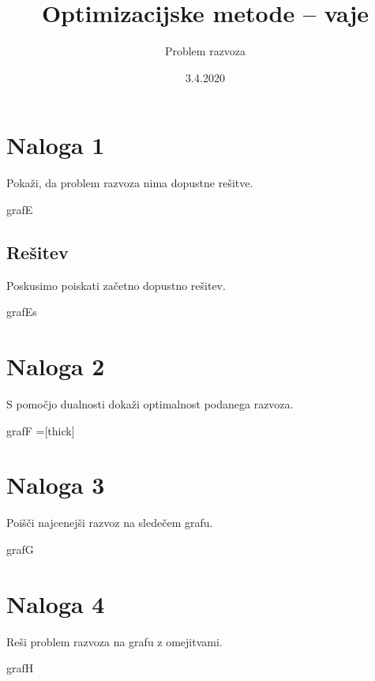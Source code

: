 \documentclass[14pt]{extarticle}
\title{Optimizacijske metode -- vaje}
\author{Problem razvoza}
\date{3.4.2020}
\begin{document}
\maketitle

\section*{Naloga 1}

Pokaži, da problem razvoza nima dopustne rešitve.

\begin{razvoz}{grafE}
\end{razvoz}

\clearpage

\subsection*{Rešitev}

Poskusimo poiskati začetno dopustno rešitev.

\begin{razvoz}{grafEs}
\end{razvoz}

\clearpage

\section*{Naloga 2}

S pomočjo dualnosti dokaži optimalnost podanega razvoza.

\begin{razvoz}{grafF}
    =[thick]

\end{razvoz}

\clearpage

\section*{Naloga 3}

Poišči najcenejši razvoz na sledečem grafu.

\begin{razvoz}[scale=0.9]{grafG}
\end{razvoz}

\clearpage

\section*{Naloga 4}

Reši problem razvoza na grafu z omejitvami.

\begin{razvoz}[scale=0.8]{grafH}
\end{razvoz}
\end{document}
